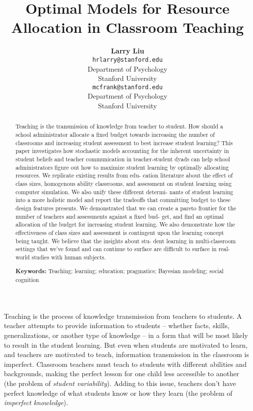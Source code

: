 \documentclass[10pt, letterpaper]{article}
\title{Optimal Models for Resource Allocation in Classroom Teaching}
\author{{\large \bf Larry Liu} \\ \texttt{hrlarry@stanford.edu} \\ Department of Psychology \\ Stanford University \And {\large \bf Michael C. Frank} \\ \texttt{mcfrank@stanford.edu} \\ Department of Psychology \\ Stanford University}
\begin{document}
\maketitle

\begin{abstract}
Teaching is the transmission of knowledge from teacher to student. How
should a school administrator allocate a fixed budget towards increasing
the number of classrooms and increasing student assessment to best
increase student learning? This paper investigates how stochastic models
accounting for the inherent uncertainty in student beliefs and teacher
communication in teacher-student dyads can help school administrators
figure out how to maximize student learning by optimally allocating
resources. We replicate existing results from edu- cation literature
about the effect of class sizes, homogenous ability classrooms, and
assessment on student learning using computer simulation. We also unify
these different determi- nants of student learning into a more holistic
model and report the tradeoffs that committing budget to these design
features presents. We demonstrated that we can create a pareto frontier
for the number of teachers and assessments against a fixed bud- get, and
find an optimal allocation of the budget for increasing student
learning. We also demonstrate how the effectiveness of class sizes and
assessment is contingent upon the learning concept being taught. We
believe that the insights about stu- dent learning in multi-classroom
settings that we've found and can continue to surface are difficult to
surface in real-world studies with human subjects.

\textbf{Keywords:}
Teaching; learning; education; pragmatics; Bayesian modeling; social
cognition
\end{abstract}

Teaching is the process of knowledge transmission from teachers to
students. A teacher attempts to provide information to students --
whether facts, skills, generalizations, or another type of knowledge --
in a form that will be most likely to result in the student learning.
But even when students are motivated to learn, and teachers are
motivated to teach, information transmission in the classroom is
imperfect. Classroom teachers must teach to students with different
abilities and backgrounds, making the perfect lesson for one child less
accessible to another (the problem of \emph{student variability}).
Adding to this issue, teachers don't have perfect knowledge of what
students know or how they learn (the problem of \emph{imperfect
knowledge}).
\end{document}
